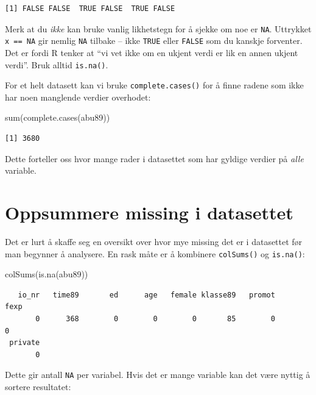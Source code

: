 \documentclass[
  norsk,
  letterpaper,
  DIV=11,
  numbers=noendperiod]{scrreprt}
\newenvironment{Shaded}{\begin{snugshade}}{\end{snugshade}}
\newcommand{\FunctionTok}[1]{\textcolor[rgb]{0.28,0.35,0.67}{#1}}
\newcommand{\NormalTok}[1]{\textcolor[rgb]{0.00,0.23,0.31}{#1}}
\theoremstyle{definition}
\theoremstyle{remark}
\begin{document}
\begin{verbatim}
[1] FALSE FALSE  TRUE FALSE  TRUE FALSE
\end{verbatim}

Merk at du \emph{ikke} kan bruke vanlig likhetstegn for å sjekke om noe
er \texttt{NA}. Uttrykket \texttt{x\ ==\ NA} gir nemlig \texttt{NA}
tilbake -- ikke \texttt{TRUE} eller \texttt{FALSE} som du kanskje
forventer. Det er fordi R tenker at ``vi vet ikke om en ukjent verdi er
lik en annen ukjent verdi''. Bruk alltid \texttt{is.na()}.

For et helt datasett kan vi bruke \texttt{complete.cases()} for å finne
radene som ikke har noen manglende verdier overhodet:

\begin{Shaded}
\begin{Highlighting}[]
\FunctionTok{sum}\NormalTok{(}\FunctionTok{complete.cases}\NormalTok{(abu89))}
\end{Highlighting}
\end{Shaded}

\begin{verbatim}
[1] 3680
\end{verbatim}

Dette forteller oss hvor mange rader i datasettet som har gyldige
verdier på \emph{alle} variable.

\section{Oppsummere missing i
datasettet}\label{oppsummere-missing-i-datasettet}

Det er lurt å skaffe seg en oversikt over hvor mye missing det er i
datasettet før man begynner å analysere. En rask måte er å kombinere
\texttt{colSums()} og \texttt{is.na()}:

\begin{Shaded}
\begin{Highlighting}[]
\FunctionTok{colSums}\NormalTok{(}\FunctionTok{is.na}\NormalTok{(abu89))}
\end{Highlighting}
\end{Shaded}

\begin{verbatim}
   io_nr   time89       ed      age   female klasse89   promot     fexp 
       0      368        0        0        0       85        0        0 
 private 
       0 
\end{verbatim}

Dette gir antall \texttt{NA} per variabel. Hvis det er mange variable
kan det være nyttig å sortere resultatet:
\end{document}
